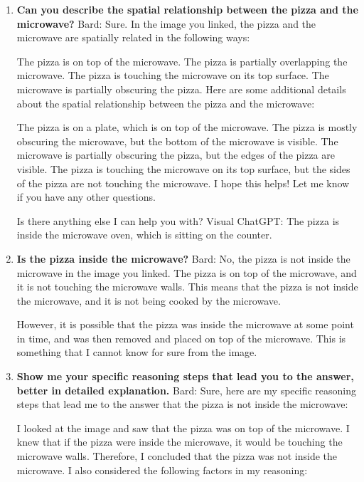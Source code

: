     \begin{enumerate}
        \item \textbf{Can you describe the spatial relationship between the pizza and the microwave?}
        \subitem Bard: 
        Sure. In the image you linked, the pizza and the microwave are spatially related in the following ways:
        
        The pizza is on top of the microwave.
        The pizza is partially overlapping the microwave.
        The pizza is touching the microwave on its top surface.
        The microwave is partially obscuring the pizza.
        Here are some additional details about the spatial relationship between the pizza and the microwave:
        
        The pizza is on a plate, which is on top of the microwave.
        The pizza is mostly obscuring the microwave, but the bottom of the microwave is visible.
        The microwave is partially obscuring the pizza, but the edges of the pizza are visible.
        The pizza is touching the microwave on its top surface, but the sides of the pizza are not touching the microwave.
        I hope this helps! Let me know if you have any other questions.
        
        Is there anything else I can help you with?
        \subitem Visual ChatGPT: The pizza is inside the microwave oven, which is sitting on the counter.
        \item \textbf{Is the pizza inside the microwave?}
        \subitem Bard: 
        No, the pizza is not inside the microwave in the image you linked. The pizza is on top of the microwave, and it is not touching the microwave walls. This means that the pizza is not inside the microwave, and it is not being cooked by the microwave.
        
        However, it is possible that the pizza was inside the microwave at some point in time, and was then removed and placed on top of the microwave. This is something that I cannot know for sure from the image.
        \item \textbf{Show me your specific reasoning steps that lead you to the answer, better in detailed explanation.}
        \subitem Bard: 
        Sure, here are my specific reasoning steps that lead me to the answer that the pizza is not inside the microwave:
        
        I looked at the image and saw that the pizza was on top of the microwave.
        I knew that if the pizza were inside the microwave, it would be touching the microwave walls.
        Therefore, I concluded that the pizza was not inside the microwave.
        I also considered the following factors in my reasoning:
        

\end{enumerate}
